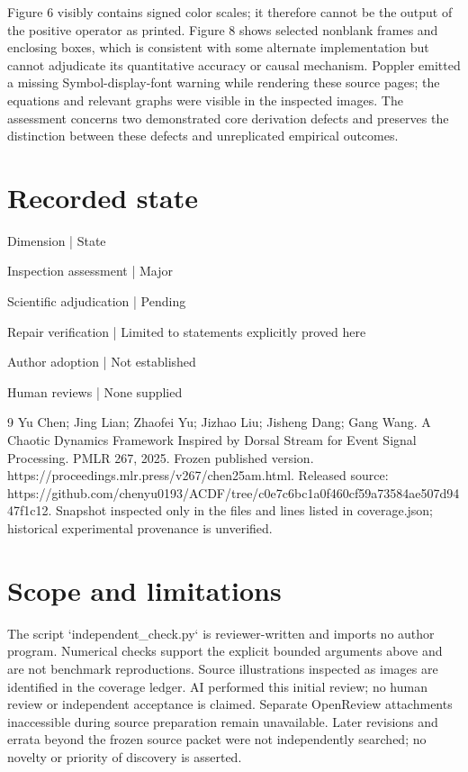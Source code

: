 \documentclass[10pt]{article}
\begin{document}
Figure 6 visibly contains signed color scales; it therefore cannot be the output of the positive operator as printed. Figure 8 shows selected nonblank frames and enclosing boxes, which is consistent with some alternate implementation but cannot adjudicate its quantitative accuracy or causal mechanism. Poppler emitted a missing Symbol-display-font warning while rendering these source pages; the equations and relevant graphs were visible in the inspected images. The assessment concerns two demonstrated core derivation defects and preserves the distinction between these defects and unreplicated empirical outcomes.\par
\section*{Recorded state}
Dimension | State\par
Inspection assessment | Major\par
Scientific adjudication | Pending\par
Repair verification | Limited to statements explicitly proved here\par
Author adoption | Not established\par
Human reviews | None supplied\par
9 Yu Chen; Jing Lian; Zhaofei Yu; Jizhao Liu; Jisheng Dang; Gang Wang. A Chaotic Dynamics Framework Inspired by Dorsal Stream for Event Signal Processing. PMLR 267, 2025. Frozen published version. https://proceedings.mlr.press/v267/chen25am.html. Released source: https://github.com/chenyu0193/ACDF/tree/c0e7c6bc1a0f460cf59a73584ae507d9447f1c12. Snapshot inspected only in the files and lines listed in coverage.json; historical experimental provenance is unverified.\par
\section*{Scope and limitations}
The script `independent\_check.py` is reviewer-written and imports no author program. Numerical checks support the explicit bounded arguments above and are not benchmark reproductions. Source illustrations inspected as images are identified in the coverage ledger. AI performed this initial review; no human review or independent acceptance is claimed. Separate OpenReview attachments inaccessible during source preparation remain unavailable. Later revisions and errata beyond the frozen source packet were not independently searched; no novelty or priority of discovery is asserted.\par
\end{document}
